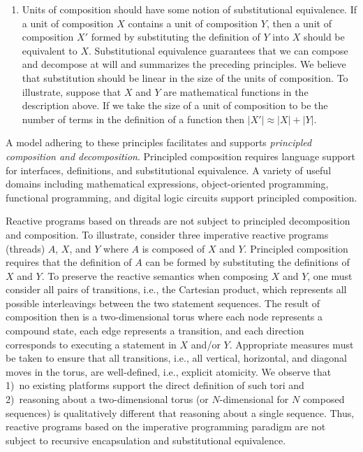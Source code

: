 \begin{enumerate}
\item Units of composition should have some notion of substitutional equivalence.
If a unit of composition $X$ contains a unit of composition $Y$, then a unit of composition $X'$ formed by substituting the definition of $Y$ into $X$ should be equivalent to $X$.
Substitutional equivalence guarantees that we can compose and decompose at will and summarizes the preceding principles.
We believe that substitution should be linear in the size of the units of composition.
To illustrate, suppose that $X$ and $Y$ are mathematical functions in the description above. %
If we take the size of a unit of composition to be the number of terms in the definition of a function then $|X'| \approx |X| + |Y|$.
\end{enumerate}
A model adhering to these principles facilitates and supports \emph{principled composition and decomposition}.
Principled composition requires language support for interfaces, definitions, and substitutional equivalence.
A variety of useful domains including mathematical expressions, object-oriented programming, functional programming, and digital logic circuits support principled composition.

Reactive programs based on threads are not subject to principled decomposition and composition.
To illustrate, consider three imperative reactive programs (threads) $A$, $X$, and $Y$ where $A$ is composed of $X$ and $Y$.
Principled composition requires that the definition of $A$ can be formed by substituting the definitions of $X$ and $Y$.
To preserve the reactive semantics when composing $X$ and $Y$, one must consider all pairs of transitions, i.e., the Cartesian product, which represents all possible interleavings between the two statement sequences.
The result of composition then is a two-dimensional torus where each node represents a compound state, each edge represents a transition, and each direction corresponds to executing a statement in $X$ and/or $Y$.
Appropriate measures must be taken to ensure that all transitions, i.e., all vertical, horizontal, and diagonal moves in the torus, are well-defined, i.e., explicit atomicity.
We observe that 1)~no existing platforms support the direct definition of such tori and 2)~reasoning about a two-dimensional torus (or $N$-dimensional for $N$ composed sequences) is qualitatively different that reasoning about a single sequence.
Thus, reactive programs based on the imperative programming paradigm are not subject to recursive encapsulation and substitutional equivalence.

